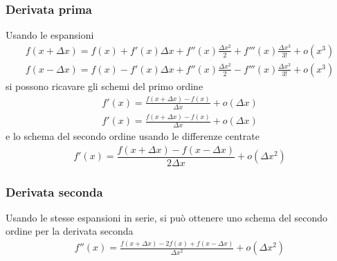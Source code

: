 \documentclass[letterpaper,10pt,english]{jupyterBook}
\begin{document}
\subsubsection{Derivata prima}
\label{\detokenize{ch/numerics/derivatives:derivata-prima}}
\sphinxAtStartPar
Usando le espansioni
\begin{equation*}
\begin{split}f(x + \Delta x) = f(x) + f'(x) \Delta x + f''(x) \frac{\Delta x^2}{2} + f'''(x) \frac{\Delta x^3}{3!} + o(x^3)\end{split}
\end{equation*}\begin{equation*}
\begin{split}f(x - \Delta x) = f(x) - f'(x) \Delta x + f''(x) \frac{\Delta x^2}{2} - f'''(x) \frac{\Delta x^3}{3!} + o(x^3)\end{split}
\end{equation*}
\sphinxAtStartPar
si possono ricavare gli schemi del primo ordine
\begin{equation*}
\begin{split}f'(x) = \frac{f(x+\Delta x) - f(x)}{\Delta x} + o(\Delta x)\end{split}
\end{equation*}\begin{equation*}
\begin{split}f'(x) = \frac{f(x+\Delta x) - f(x)}{\Delta x} + o(\Delta x)\end{split}
\end{equation*}
\sphinxAtStartPar
e lo schema del secondo ordine usando le differenze centrate
\begin{equation*}
\begin{split}f'(x) = \dfrac{f(x+\Delta x) - f(x-\Delta x)}{2 \Delta x} + o(\Delta x^2) \end{split}
\end{equation*}

\subsubsection{Derivata seconda}
\label{\detokenize{ch/numerics/derivatives:derivata-seconda}}
\sphinxAtStartPar
Usando le stesse espansioni in serie, si può ottenere uno schema del secondo ordine per la derivata seconda
\begin{equation*}
\begin{split}f''(x) = \frac{f(x+\Delta x) - 2 f(x) + f(x-\Delta x)}{\Delta x^2} + o(\Delta x^2)\end{split}
\end{equation*}
\sphinxstepscope
\end{document}
